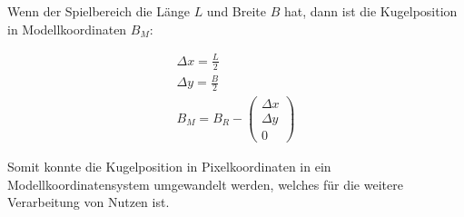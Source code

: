 Wenn der Spielbereich die Länge $L$ und Breite $B$ hat, dann ist die Kugelposition in Modellkoordinaten $B_M$:

\begin{align}
\Delta x = \frac{L}{2}\\
\Delta y = \frac{B}{2}\\
B_M = B_R - \begin{pmatrix}\Delta x\\\Delta y\\0\end{pmatrix}
\end{align}

Somit konnte die Kugelposition in Pixelkoordinaten in ein Modellkoordinatensystem umgewandelt werden, welches für
die weitere Verarbeitung von Nutzen ist.
